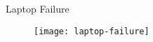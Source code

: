 \begin{frame}[t]{}
	\Huge Laptop Failure
	\begin{figure}
		\centering
		\texttt{[image: laptop-failure]}
	\end{figure}
\end{frame}

